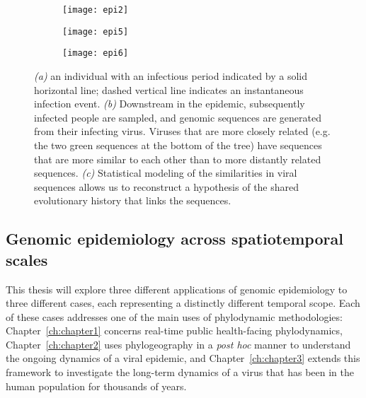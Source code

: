 \begin{figure}[ht]
  \centering
  \begin{subfigure}{0.45\textwidth}
    \texttt{[image: epi2]}
    \label{fig:epiProcess1}
    \caption{}
  \end{subfigure}
  \begin{subfigure}{0.45\textwidth}
    \texttt{[image: epi5]}
    \label{fig:epiProcess2}
    \caption{}
  \end{subfigure}
  \begin{subfigure}{0.45\textwidth}
    \texttt{[image: epi6]}
    \label{fig:epiProcess3}
    \caption{}
  \end{subfigure}
  \caption[The epidemic process is inherently treelike]{\textit{(a)} an individual with an infectious period indicated by a solid horizontal line; dashed vertical line indicates an instantaneous infection event. \textit{(b)} Downstream in the epidemic, subsequently infected people are sampled, and genomic sequences are generated from their infecting virus. Viruses that are more closely related (e.g. the two green sequences at the bottom of the tree) have sequences that are more similar to each other than to more distantly related sequences. \textit{(c)} Statistical modeling of the similarities in viral sequences allows us to reconstruct a hypothesis of the shared evolutionary history that links the sequences.}
  \label{fig:epiProcess}
\end{figure}

\subsection{Genomic epidemiology across spatiotemporal scales}
This thesis will explore three different applications of genomic epidemiology to three different cases, each representing a distinctly different temporal scope.
Each of these cases addresses one of the main uses of phylodynamic methodologies: Chapter~\ref{ch:chapter1} concerns real-time public health-facing phylodynamics, Chapter~\ref{ch:chapter2} uses phylogeography in a \textit{post hoc} manner to understand the ongoing dynamics of a viral epidemic, and Chapter~\ref{ch:chapter3} extends this framework to investigate the long-term dynamics of a virus that has been in the human population for thousands of years.

